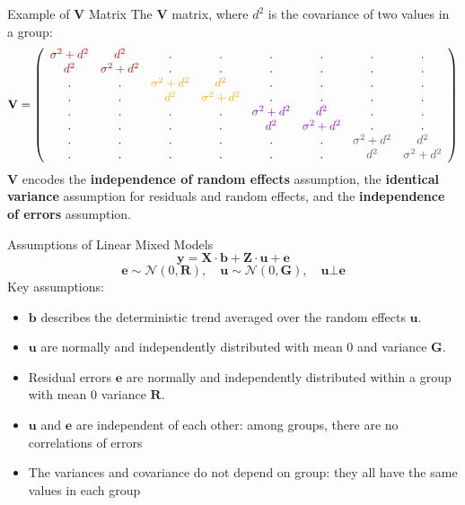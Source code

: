 \documentclass{beamer}
\begin{document}
\begin{frame}{Example of $\mathbf{V}$ Matrix}
\large
The $\mathbf{V}$ matrix, where $\mathit{d^2}$ is the covariance of two values in a group:
\tiny
\[
\mathbf{V} = \left( 
\begin{array}{cccccccc} 
\color{darkred}{\sigma^2 + d^2} & \color{darkred}{d^2} & . & . & . & . & . & . \\ 
\color{darkred}{d^2} & \color{darkred}{\sigma^2 + d^2} & . & . & . & . & . & . \\
. & . & \color{orange}{\sigma^2 + d^2} & \color{orange}{d^2} & . & . & . & .\\ 
. & . & \color{orange}{d^2} & \color{orange}{\sigma^2 + d^2} & . & . & . & .\\ 
. & . & . & . & \color{violet}{\sigma^2 + d^2} & \color{violet}{d^2} & . & .\\ 
. & . & . & . & \color{violet}{d^2} & \color{violet}{\sigma^2 + d^2} & . & .\\ 
. & . & . & . & . & . & \color{darkgray}{\sigma^2 + d^2} & \color{darkgray}{d^2}\\ 
. & . & . & . & . & . & \color{darkgray}{d^2} & \color{darkgray}{\sigma^2 + d^2}
\end{array} \right)
\]
\large
$\mathbf{V}$ encodes the \textbf{independence of random effects} assumption, the \textbf{identical variance} assumption for residuals and random effects, and the \textbf{independence of errors} assumption.
\end{frame}

\begin{frame}{Assumptions of Linear Mixed Models}
\[
\mathbf{y} = \mathbf{X} \cdot \mathbf{b} + \mathbf{Z} \cdot \mathbf{u} + \mathbf{e}
\]
\[
\mathbf{e} \sim \mathcal{N}(0, \mathbf{R}), \quad \mathbf{u} \sim \mathcal{N}(0, \mathbf{G}), \quad \mathbf{u} \bot \mathbf{e}
\]
Key assumptions:
\begin{itemize}
  \item $\mathbf{b}$ describes the deterministic trend averaged over the random effects $\mathbf{u}$.
  \item $\mathbf{u}$ are normally and independently distributed with mean 0 and variance $\mathbf{G}$.
  \item Residual errors $\mathbf{e}$ are normally and independently distributed within a group with mean 0 variance $\mathbf{R}$.
  \item $\mathbf{u}$ and $\mathbf{e}$ are independent of each other: among groups, there are no correlations of errors
  \item The variances and covariance do not depend on group: they all have the same values in each group
\end{itemize}
\end{frame}
\end{document}
